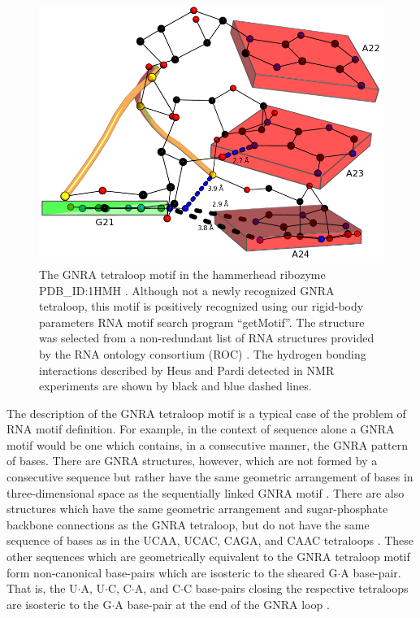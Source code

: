 \begin{figure}
\centering
\includegraphics[angle=0, scale=0.38]{Chapter5/gnra21L2.png}
\caption{The   GNRA  tetraloop  motif   in  the   hammerhead  ribozyme
  PDB\_ID:1HMH \cite{pley1994}.  Although  not a newly recognized GNRA
  tetraloop, this motif is  positively recognized using our rigid-body
  parameters RNA motif search  program ``getMotif''. The structure was
  selected from a non-redundant list of RNA structures provided by the
  RNA  ontology consortium  (ROC)  \cite{leontis2006b}.  The  hydrogen
  bonding  interactions described  by Heus  and  Pardi \cite{heus1991}
  detected  in NMR  experiments are  shown  by black  and blue  dashed
  lines.}
\label{fig:gnrablocks}
\end{figure}

The description of  the GNRA tetraloop motif is a  typical case of the
problem  of RNA  motif definition.   For  example, in  the context  of
sequence  alone  a  GNRA motif  would  be  one  which contains,  in  a
consecutive  manner,  the  GNRA  pattern  of bases.   There  are  GNRA
structures, however,  which are not  formed by a  consecutive sequence
but  rather   have  the  same   geometric  arrangement  of   bases  in
three-dimensional  space   as  the  sequentially   linked  GNRA  motif
\cite{lee2003, lemieux2006}.  There are also structures which have the
same geometric arrangement and sugar-phosphate backbone connections as
the GNRA tetraloop,  but do not have the same sequence  of bases as in
the UCAA,  UCAC, CAGA, and CAAC  tetraloops \cite{lemieux2006}.  These
other  sequences  which  are  geometrically  equivalent  to  the  GNRA
tetraloop motif  form non-canonical base-pairs which  are isosteric to
the sheared  G$\cdot$A base-pair.  That is, the  U$\cdot$A, U$\cdot$C,
C$\cdot$A, and C$\cdot$C  base-pairs closing the respective tetraloops
are isosteric to  the G$\cdot$A base-pair at the end  of the GNRA loop
\cite{lemieux2006}.

